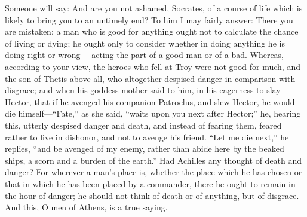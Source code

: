 \documentclass[12pt]{article}
\begin{document}
Someone will say: And are you not ashamed, Socrates, of a course of
life which is likely to bring you to an untimely end? To him I may
fairly answer: There you are mistaken: a man who is good for anything
ought not to calculate the chance of living or dying; he ought only
to consider whether in doing anything he is doing right or wrong---
acting the part of a good man or of a bad. Whereas, according to your
view, the heroes who fell at Troy were not good for much, and the
son of Thetis above all, who altogether despised danger in comparison
with disgrace; and when his goddess mother said to him, in his eagerness
to slay Hector, that if he avenged his companion Patroclus, and slew
Hector, he would die himself---``Fate,'' as she said, ``waits upon you
next after Hector;'' he, hearing this, utterly despised danger and
death, and instead of fearing them, feared rather to live in dishonor,
and not to avenge his friend. ``Let me die next,'' he replies, ``and
be avenged of my enemy, rather than abide here by the beaked ships,
a scorn and a burden of the earth.'' Had Achilles any thought of death
and danger? For wherever a man's place is, whether the place which
he has chosen or that in which he has been placed by a commander,
there he ought to remain in the hour of danger; he should not think
of death or of anything, but of disgrace. And this, O men of Athens,
is a true saying.
\end{document}
